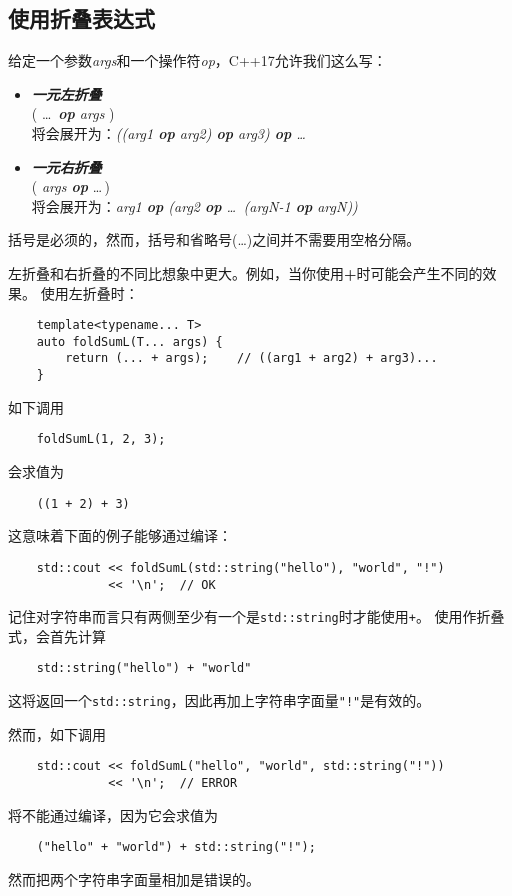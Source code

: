 \subsection{使用折叠表达式}\label{ch11.2}
给定一个参数\emph{args}和一个操作符\emph{op}，C++17允许我们这么写：
\begin{itemize}[leftmargin=*]
    \item \emph{\textbf{一元左折叠}}\\
    ( \ldots \, \emph{\textbf{op} args} )\\
    将会展开为：\emph{((arg1 \textbf{op} arg2) \textbf{op} arg3) \textbf{op} \ldots}
    \item \emph{\textbf{一元右折叠}}\\
    ( \emph{args \textbf{op}} \ldots \,)\\
    将会展开为：\emph{arg1 \textbf{op} (arg2 \textbf{op} \ldots \, (argN-1 \textbf{op} argN))}
\end{itemize}
括号是必须的，然而，括号和省略号(\ldots)之间并不需要用空格分隔。

左折叠和右折叠的不同比想象中更大。例如，当你使用\textbf{+}时可能会产生不同的效果。
使用左折叠时：
\begin{lstlisting}
    template<typename... T>
    auto foldSumL(T... args) {
        return (... + args);    // ((arg1 + arg2) + arg3)...
    }
\end{lstlisting}
如下调用
\begin{lstlisting}
    foldSumL(1, 2, 3);
\end{lstlisting}
会求值为
\begin{lstlisting}
    ((1 + 2) + 3)
\end{lstlisting}
这意味着下面的例子能够通过编译：
\begin{lstlisting}
    std::cout << foldSumL(std::string("hello"), "world", "!")
              << '\n';  // OK
\end{lstlisting}
记住对字符串而言只有两侧至少有一个是\texttt{std::string}时才能使用\texttt{+}。
使用作折叠式，会首先计算
\begin{lstlisting}
    std::string("hello") + "world"
\end{lstlisting}
这将返回一个\texttt{std::string}，因此再加上字符串字面量\texttt{"!"}是有效的。

然而，如下调用
\begin{lstlisting}
    std::cout << foldSumL("hello", "world", std::string("!"))
              << '\n';  // ERROR
\end{lstlisting}
将不能通过编译，因为它会求值为
\begin{lstlisting}
    ("hello" + "world") + std::string("!");
\end{lstlisting}
然而把两个字符串字面量相加是错误的。

